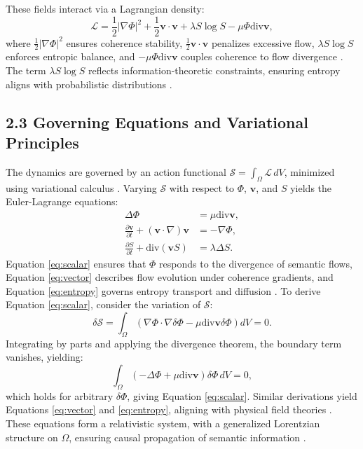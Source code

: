 \documentclass[12pt]{article}
\begin{document}
These fields interact via a Lagrangian density:
\[
\mathcal{L} = \frac{1}{2} |\nabla \Phi|^2 + \frac{1}{2} \mathbf{v} \cdot \mathbf{v} + \lambda S \log S - \mu \Phi \text{div} \mathbf{v},
\]
where \(\frac{1}{2} |\nabla \Phi|^2\) ensures coherence stability, \(\frac{1}{2} \mathbf{v} \cdot \mathbf{v}\) penalizes excessive flow, \(\lambda S \log S\) enforces entropic balance, and \(-\mu \Phi \text{div} \mathbf{v}\) couples coherence to flow divergence \citep{atiyah1969}. The term \(\lambda S \log S\) reflects information-theoretic constraints, ensuring entropy aligns with probabilistic distributions \citep{jaynes2003}.

\subsection*{2.3 Governing Equations and Variational Principles}

The dynamics are governed by an action functional \(\mathcal{S} = \int_{\Omega} \mathcal{L} \, dV\), minimized using variational calculus \citep{atiyah1969}. Varying \(\mathcal{S}\) with respect to \(\Phi\), \(\mathbf{v}\), and \(S\) yields the Euler-Lagrange equations:
\begin{align}
\Delta \Phi &= \mu \text{div} \mathbf{v}, \label{eq:scalar} \\
\frac{\partial \mathbf{v}}{\partial t} + (\mathbf{v} \cdot \nabla) \mathbf{v} &= -\nabla \Phi, \label{eq:vector} \\
\frac{\partial S}{\partial t} + \text{div} (\mathbf{v} S) &= \lambda \Delta S. \label{eq:entropy}
\end{align}
Equation \eqref{eq:scalar} ensures that \(\Phi\) responds to the divergence of semantic flows, Equation \eqref{eq:vector} describes flow evolution under coherence gradients, and Equation \eqref{eq:entropy} governs entropy transport and diffusion \citep{gromov1999}. To derive Equation \eqref{eq:scalar}, consider the variation of \(\mathcal{S}\):
\[
\delta \mathcal{S} = \int_{\Omega} \left( \nabla \Phi \cdot \nabla \delta \Phi - \mu \text{div} \mathbf{v} \delta \Phi \right) dV = 0.
\]
Integrating by parts and applying the divergence theorem, the boundary term vanishes, yielding:
\[
\int_{\Omega} \left( -\Delta \Phi + \mu \text{div} \mathbf{v} \right) \delta \Phi \, dV = 0,
\]
which holds for arbitrary \(\delta \Phi\), giving Equation \eqref{eq:scalar}. Similar derivations yield Equations \eqref{eq:vector} and \eqref{eq:entropy}, aligning with physical field theories \citep{baez2011}. These equations form a relativistic system, with a generalized Lorentzian structure on \(\Omega\), ensuring causal propagation of semantic information \citep{baez2011}.
\end{document}
